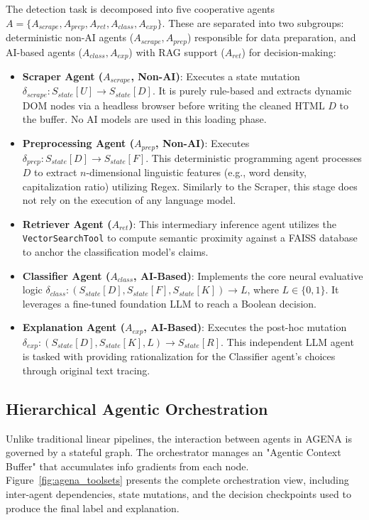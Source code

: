 \documentclass{ieeeaccess}
\begin{document}
The detection task is decomposed into five cooperative agents $A = \{A_{scrape}, A_{prep}, A_{ret}, A_{class}, A_{exp}\}$. These are separated into two subgroups: deterministic non-AI agents ($A_{scrape}, A_{prep}$) responsible for data preparation, and AI-based agents ($A_{class}, A_{exp}$) with RAG support ($A_{ret}$) for decision-making:
\begin{itemize}
    \item \textbf{Scraper Agent ($A_{scrape}$, Non-AI)}: Executes a state mutation $\delta_{scrape}: S_{state}[U] \rightarrow S_{state}[D]$. It is purely rule-based and extracts dynamic DOM nodes via a headless browser before writing the cleaned HTML $D$ to the buffer. No AI models are used in this loading phase.
    \item \textbf{Preprocessing Agent ($A_{prep}$, Non-AI)}: Executes $\delta_{prep}: S_{state}[D] \rightarrow S_{state}[F]$. This deterministic programming agent processes $D$ to extract $n$-dimensional linguistic features (e.g., word density, capitalization ratio) utilizing Regex. Similarly to the Scraper, this stage does not rely on the execution of any language model.
    \item \textbf{Retriever Agent ($A_{ret}$)}: This intermediary inference agent utilizes the \texttt{VectorSearchTool} to compute semantic proximity against a FAISS database to anchor the classification model's claims.
    \item \textbf{Classifier Agent ($A_{class}$, AI-Based)}: Implements the core neural evaluative logic $\delta_{class}: (S_{state}[D], S_{state}[F], S_{state}[K]) \rightarrow L$, where $L \in \{0, 1\}$. It leverages a fine-tuned foundation LLM to reach a Boolean decision.
    \item \textbf{Explanation Agent ($A_{exp}$, AI-Based)}: Executes the post-hoc mutation $\delta_{exp}: (S_{state}[D], S_{state}[K], L) \rightarrow S_{state}[R]$. This independent LLM agent is tasked with providing rationalization for the Classifier agent's choices through original text tracing.
\end{itemize}

\subsection{Hierarchical Agentic Orchestration}
Unlike traditional linear pipelines, the interaction between agents in AGENA is governed by a stateful graph. The orchestrator manages an "Agentic Context Buffer" that accumulates info gradients from each node.
Figure~\ref{fig:agena_toolsets} presents the complete orchestration view, including inter-agent dependencies, state mutations, and the decision checkpoints used to produce the final label and explanation.
\end{document}
